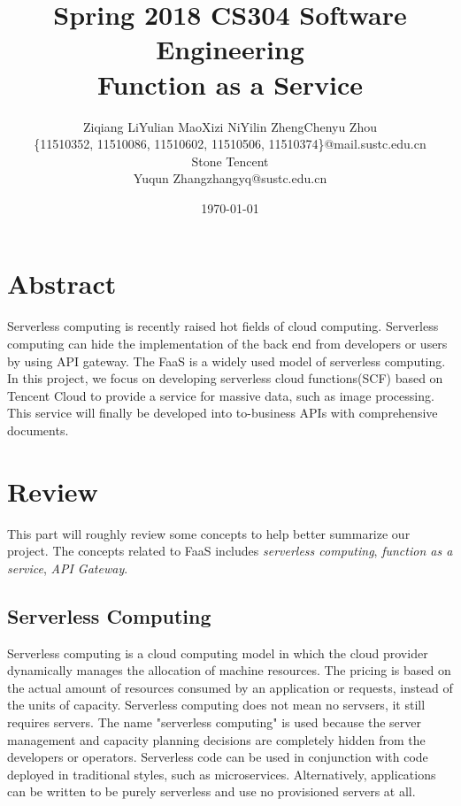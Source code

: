 \documentclass[a4paper,12pt]{article}
\begin{document}

\title{Spring 2018 CS304 Software Engineering\\Function as a Service}
\author{Ziqiang Li\quad Yulian Mao\quad Xizi Ni\quad Yilin Zheng\quad Chenyu Zhou\\
\small \{11510352, 11510086, 11510602, 11510506, 11510374\}@mail.sustc.edu.cn\\
Stone Tencent\\
Yuqun Zhang\quad zhangyq@sustc.edu.cn}
\date{\today}



\maketitle


\section{Abstract}
Serverless computing is recently raised hot fields of cloud computing. Serverless computing can hide the implementation of the back end from developers or users by using API gateway. The FaaS is a widely used model of serverless computing. In this project, we focus on developing serverless cloud functions(SCF) based on Tencent Cloud to provide a service for massive data, such as image processing. This service will finally be developed into to-business APIs with comprehensive documents.

\section{Review}
This part will roughly review some concepts to help better summarize our project. The concepts related to FaaS includes \textit{serverless computing}, \textit{function as a service}, \textit{API Gateway}.  

\subsection{Serverless Computing}
Serverless computing is a cloud computing model in which the cloud provider dynamically manages the allocation of machine resources. The pricing is based on the actual amount of resources consumed by an application or requests, instead of the units of capacity. Serverless computing does not mean no servsers, it still requires servers. The name "serverless computing" is used because the server management and capacity planning decisions are completely hidden from the developers or operators. Serverless code can be used in conjunction with code deployed in traditional styles, such as microservices. Alternatively, applications can be written to be purely serverless and use no provisioned servers at all\cite{serverless}.
\end{document}
